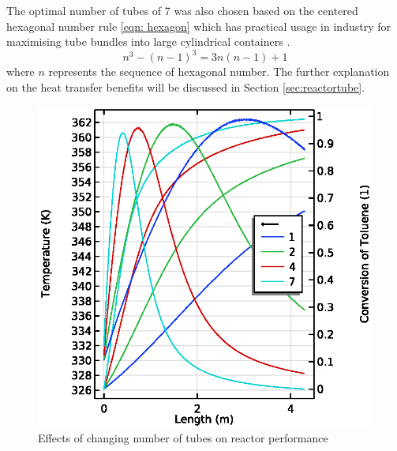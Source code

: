 The optimal number of tubes of 7 was also chosen based on the centered hexagonal number rule \cref{eqn: hexagon} which has practical usage in industry for maximising tube bundles into large cylindrical containers \cite{noauthor_realiable_2018}. 
\begin{equation}
    n^3 - (n-1)^3 = 3n(n-1)+1
    \label{eqn: hexagon}
\end{equation}
where $n$ represents the sequence of hexagonal number. The further explanation on the heat transfer benefits will be discussed in Section \ref{sec:reactortube}.


\begin{figure}[h]
    \centering
    \begin{minipage}[t]{0.45\linewidth}
        \includegraphics[width=\linewidth]{figures/S5-T-X.eps}
        \caption{Effects of changing number of tubes on reactor performance}
        \label{fig:S5-T-X}
    \end{minipage}\hfill
    \begin{minipage}[t]{0.45\linewidth}

\end{minipage}
\end{figure}
